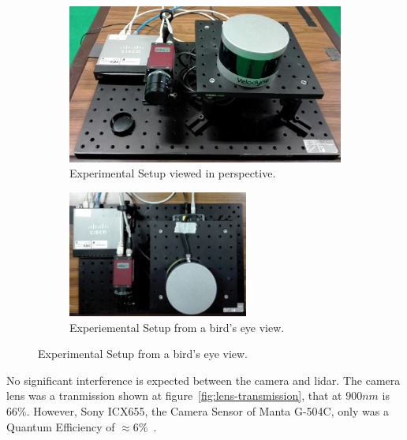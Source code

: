 \begin{figure}[H]
	\centering
	\begin{subfigure}[c]{0.45\textwidth}
		\includegraphics[width=\textwidth]{img/experimental-setup/table-setup-cambada-perspective.jpg}
		\caption{Experimental Setup viewed in perspective.}
		\label{fig:experimental-setup:perspective}
	\end{subfigure}
	\qquad
	\begin{subfigure}[c]{0.45\textwidth}
		\includegraphics[width=0.65\textwidth, keepaspectratio, angle=90]{img/experimental-setup/table-setup-cambada-birds-eye.jpg}
		\caption{Experiemental Setup from a bird's eye view.}
		\label{fig:experimental-setup:birds-eye}
	\end{subfigure}
	\caption{Experimental Setup from a bird's eye view.}
	\label{fig:experimental-setup}
\end{figure}

No significant interference is expected between the camera and \ac{lidar}. The camera lens was a tranmission shown at figure~\ref{fig:lens-transmission}, that at $900 nm$ is $66\%$. However, Sony ICX655, the Camera Sensor of Manta G-504C, only was a Quantum Efficiency of $\approx 6\%$~\cite{MantaG504C}.

